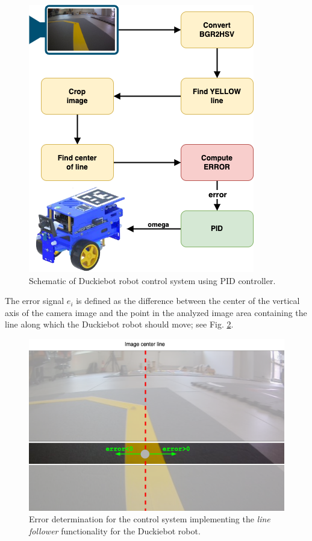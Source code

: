 \documentclass[conference]{IEEEtran}
\begin{document}
\begin{figure}[h]
    \centering
    \includegraphics[width=.8\columnwidth]{PipeLinePID}
    \caption{Schematic of Duckiebot robot control system using PID controller.}
    \label{fig:pid-pipeline}
\end{figure}

The error signal $e_i$ is defined as the difference between the center of the vertical axis of the camera image and the point in the analyzed image area containing the line along which the Duckiebot robot should move; see Fig. \ref{fig:error-definition}. 

\begin{figure}[h]
    \centering
    \includegraphics[width=.95\columnwidth]{ErrorDefinition.png}
    \caption{Error determination for the control system implementing the \emph{line follower} functionality for the Duckiebot robot.}
    \label{fig:error-definition}
\end{figure}
\end{document}
